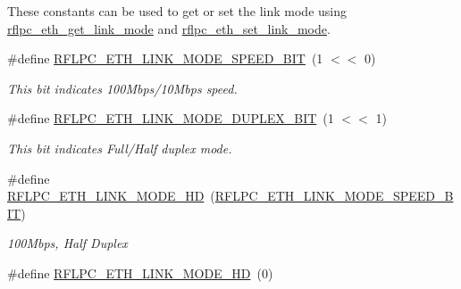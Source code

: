 These constants can be used to get or set the link mode using \hyperlink{group__eth_ga5b73a8c385152888baff90c83e34fdb0}{rflpc\-\_\-eth\-\_\-get\-\_\-link\-\_\-mode} and \hyperlink{group__eth_gad8d8a82c4aed3c98c358814619b234d9}{rflpc\-\_\-eth\-\_\-set\-\_\-link\-\_\-mode}. \begin{DoxyCompactItemize}
\item 
\hypertarget{group__eth_gaa7db2e40e7ee0641b8ef48fe7e8f5a29}{\#define \hyperlink{group__eth_gaa7db2e40e7ee0641b8ef48fe7e8f5a29}{R\-F\-L\-P\-C\-\_\-\-E\-T\-H\-\_\-\-L\-I\-N\-K\-\_\-\-M\-O\-D\-E\-\_\-\-S\-P\-E\-E\-D\-\_\-\-B\-I\-T}~(1 $<$$<$ 0)}\label{group__eth_gaa7db2e40e7ee0641b8ef48fe7e8f5a29}

\begin{DoxyCompactList}\small\item\em This bit indicates 100\-Mbps/10\-Mbps speed. \end{DoxyCompactList}\item 
\hypertarget{group__eth_ga8662c8abfaba91f359fc0c002bf5575f}{\#define \hyperlink{group__eth_ga8662c8abfaba91f359fc0c002bf5575f}{R\-F\-L\-P\-C\-\_\-\-E\-T\-H\-\_\-\-L\-I\-N\-K\-\_\-\-M\-O\-D\-E\-\_\-\-D\-U\-P\-L\-E\-X\-\_\-\-B\-I\-T}~(1 $<$$<$ 1)}\label{group__eth_ga8662c8abfaba91f359fc0c002bf5575f}

\begin{DoxyCompactList}\small\item\em This bit indicates Full/\-Half duplex mode. \end{DoxyCompactList}\item 
\hypertarget{group__eth_ga27a5eb1d19d3122a7bdbc1babf84511d}{\#define \hyperlink{group__eth_ga27a5eb1d19d3122a7bdbc1babf84511d}{R\-F\-L\-P\-C\-\_\-\-E\-T\-H\-\_\-\-L\-I\-N\-K\-\_\-\-M\-O\-D\-E\-\_\-H\-D}~(\hyperlink{group__eth_gaa7db2e40e7ee0641b8ef48fe7e8f5a29}{R\-F\-L\-P\-C\-\_\-\-E\-T\-H\-\_\-\-L\-I\-N\-K\-\_\-\-M\-O\-D\-E\-\_\-\-S\-P\-E\-E\-D\-\_\-\-B\-I\-T})}\label{group__eth_ga27a5eb1d19d3122a7bdbc1babf84511d}

\begin{DoxyCompactList}\small\item\em 100\-Mbps, Half Duplex \end{DoxyCompactList}\item 
\hypertarget{group__eth_gaf8fe530a009e9e2f27078456b7495c4c}{\#define \hyperlink{group__eth_gaf8fe530a009e9e2f27078456b7495c4c}{R\-F\-L\-P\-C\-\_\-\-E\-T\-H\-\_\-\-L\-I\-N\-K\-\_\-\-M\-O\-D\-E\-\_\-H\-D}~(0)}\label{group__eth_gaf8fe530a009e9e2f27078456b7495c4c}


\end{DoxyCompactItemize}
